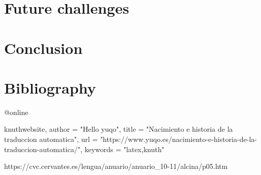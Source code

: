 \documentclass[a4paper]{article}
\theoremstyle{plain}
\theoremstyle{definition}
\begin{document}
	
	\label{sec:examples}
	\section{Future challenges}
	\label{sec:examples}
	
	\section{Conclusion}
	\label{sec:examples}	
	
	
	
	
    \usepackage{biblatex}
    \section{Bibliography}
    @online{knuthwebsite,
    author    = "Hello yuqo",
    title     = "Nacimiento e historia de la traduccion automatica",
    url       = "https://www.yuqo.es/nacimiento-e-historia-de-la-traduccion-automatica/",
    keywords  = "latex,knuth"
    
    https://cvc.cervantes.es/lengua/anuario/anuario_10-11/alcina/p05.htm
}
	
\end{document}
